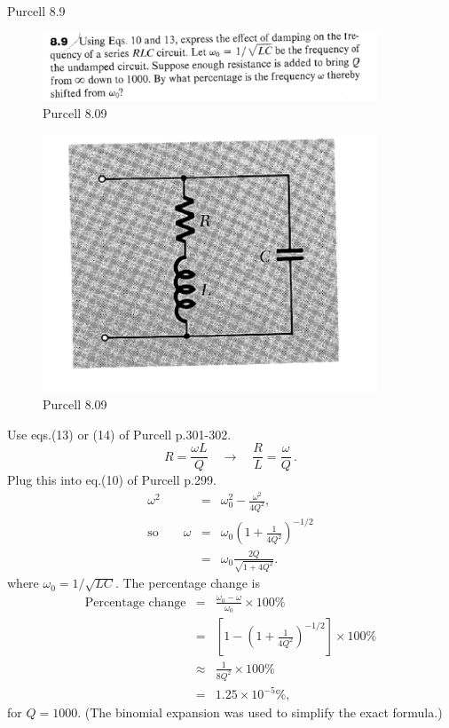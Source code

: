 \documentclass[makesolutionspdf]{esg8022pset}
\begin{document}
\begin{problem}{Purcell 8.9}
\begin{figure}[H]
    \centering
    \includegraphics[width = 10cm]{pu809}
    \caption{Purcell 8.09}
  \end{figure}
  
  \begin{figure}[H]
    \centering
    \includegraphics[width = 10cm]{figpu809}
    \caption{Purcell 8.09}
  \end{figure}
\end{problem}
\begin{solution}
Use eqs.(13) or (14) of Purcell p.301-302.
\begin{equation}
R=\frac{\omega L}{Q} \quad\to\quad \frac{R}{L}=\frac{\omega}{Q}\,.
\end{equation}
Plug this into eq.(10) of Purcell p.299.
\begin{eqnarray}
\omega^2 &=& \omega_0^2-\frac{\omega^2}{4Q^2},\\
\textrm{so} \qquad \omega &=& \omega_0 \left(1+\frac{1}{4Q^2}\right)^{-1/2}\\
&=& \omega_0\frac{2Q}{\sqrt{1+4Q^2}}.
\end{eqnarray}
where $\omega_0=1/\sqrt{LC}$.  The percentage change is
\begin{eqnarray}
\textrm{Percentage change} &=& \frac{\omega_0-\omega}{\omega_0}\times
100\%\nonumber\\
&=& \left[1-\left(1+\frac{1}{4Q^2}\right)^{-1/2}\right]\times 100\%\nonumber\\
&\approx & \frac{1}{8Q^2}\times 100\%\nonumber\\
&=& 1.25\times 10^{-5} \%,
\end{eqnarray}
for $Q=1000$.  (The binomial expansion was used to simplify the exact formula.)

\end{solution}
\end{document}
